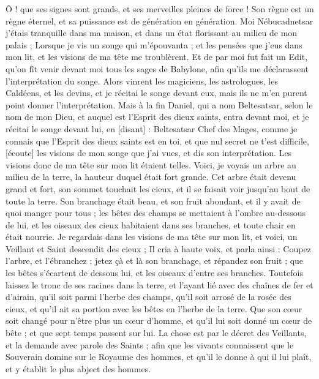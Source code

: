 \begin{multicols}{2}
Ô ! que ses signes sont grands, et ses merveilles pleines de force ! Son règne est un règne éternel, et sa puissance est de génération en génération.
Moi Nébucadnetsar j'étais tranquille dans ma maison, et dans un état florissant au milieu de mon palais ;
Lorsque je vis un songe qui m'épouvanta ; et les pensées que j'eus dans mon lit, et les visions de ma tête me troublèrent.
Et de par moi fut fait un Edit, qu'on fît venir devant moi tous les sages de Babylone, afin qu'ils me déclarassent l'interprétation du songe.
Alors vinrent les magiciens, les astrologues, les Caldéens, et les devins, et je récitai le songe devant eux, mais ils ne m'en purent point donner l'interprétation.
Mais à la fin Daniel, qui a nom Beltesatsar, selon le nom de mon Dieu, et auquel est l'Esprit des dieux saints, entra devant moi, et je récitai le songe devant lui, en [disant] :
Beltesatsar Chef des Mages, comme je connais que l'Esprit des dieux saints est en toi, et que nul secret ne t'est difficile, [écoute] les visions de mon songe que j'ai vues, et dis son interprétation.
Les visions donc de ma tête sur mon lit étaient telles. Voici, je voyais un arbre au milieu de la terre, la hauteur duquel était fort grande.
Cet arbre était devenu grand et fort, son sommet touchait les cieux, et il se faisait voir jusqu'au bout de toute la terre.
Son branchage était beau, et son fruit abondant, et il y avait de quoi manger pour tous ; les bêtes des champs se mettaient à l'ombre au-dessous de lui, et les oiseaux des cieux habitaient dans ses branches, et toute chair en était nourrie.
Je regardais dans les visions de ma tête sur mon lit, et voici, un Veillant et Saint descendit des cieux ;
Il cria à haute voix, et parla ainsi : Coupez l'arbre, et l'ébranchez ; jetez çà et là son branchage, et répandez son fruit ; que les bêtes s'écartent de dessous lui, et les oiseaux d'entre ses branches.
Toutefois laissez le tronc de ses racines dans la terre, et l'ayant lié avec des chaînes de fer et d'airain, qu'il soit parmi l'herbe des champs, qu'il soit arrosé de la rosée des cieux, et qu'il ait sa portion avec les bêtes en l'herbe de la terre.
Que son cœur soit changé pour n'être plus un cœur d'homme, et qu'il lui soit donné un cœur de bête ; et que sept temps passent sur lui.
La chose est par le décret des Veillants, et la demande avec parole des Saints ; afin que les vivants connaissent que le Souverain domine sur le Royaume des hommes, et qu'il le donne à qui il lui plaît, et y établit le plus abject des hommes.

\end{multicols}
